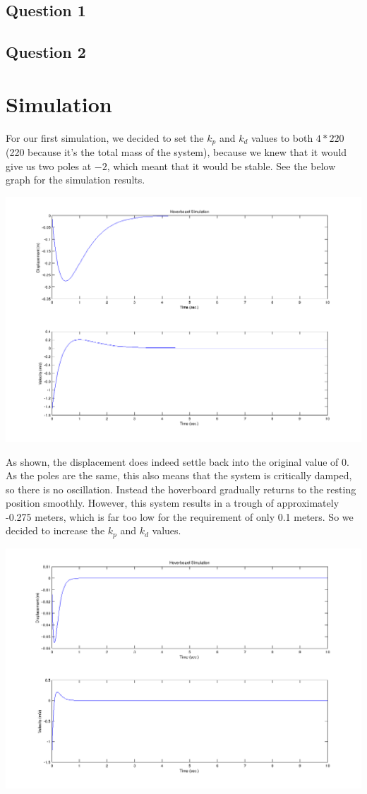 \documentclass[titlepage]{article}
\begin{document}
\subsection*{Question 1}
\subsection*{Question 2}

\section*{Simulation}

For our first simulation, we decided to set the $k_p$ and $k_d$ values to both $4*220$ (220 because it's the total mass of the system),
because we knew that it would give us two poles at $-2$, which meant that it would be stable.
See the below graph for the simulation results.

\includegraphics[scale=0.5]{k_pk_d4m.png}

As shown, the displacement does indeed settle back into the original value of 0. As the poles are the same, this also means that the system is critically damped, so there is no oscillation. Instead the hoverboard gradually returns to the resting position smoothly. However, this system results in a trough of approximately -0.275 meters, which is far too low for the requirement of only 0.1 meters. So we decided to increase the $k_p$ and $k_d$ values.

\includegraphics[scale=0.5]{k_p100mk_d20m.png}
\end{document}

